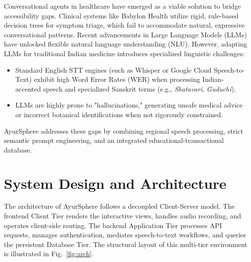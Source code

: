 \documentclass[conference]{IEEEtran}
\begin{document}
Conversational agents in healthcare have emerged as a viable solution to bridge accessibility gaps. Clinical systems like Babylon Health utilize rigid, rule-based decision trees for symptom triage, which fail to accommodate natural, expressive conversational patterns. Recent advancements in Large Language Models (LLMs) have unlocked flexible natural language understanding (NLU). However, adapting LLMs for traditional Indian medicine introduces specialized linguistic challenges:
\begin{itemize}
    \item Standard English STT engines (such as Whisper or Google Cloud Speech-to-Text) exhibit high Word Error Rates (WER) when processing Indian-accented speech and specialized Sanskrit terms (e.g., \textit{Shatavari}, \textit{Guduchi}).
    \item LLMs are highly prone to "hallucinations," generating unsafe medical advice or incorrect botanical identifications when not rigorously constrained.
\end{itemize}

AyurSphere addresses these gaps by combining regional speech processing, strict semantic prompt engineering, and an integrated educational-transactional database.

\section{System Design and Architecture}
The architecture of AyurSphere follows a decoupled Client-Server model. The frontend Client Tier renders the interactive views, handles audio recording, and operates client-side routing. The backend Application Tier processes API requests, manages authentication, mediates speech-to-text workflows, and queries the persistent Database Tier. The structural layout of this multi-tier environment is illustrated in Fig.~\ref{fig:arch}.
\end{document}
